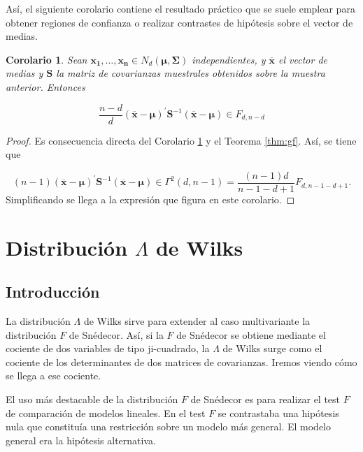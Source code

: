 \documentclass[
  a4paper,
  oneside]{scrbook}
\newtheorem{corollary}{Corolario}[chapter]
\theoremstyle{definition}
\theoremstyle{definition}
\theoremstyle{definition}
\theoremstyle{definition}
\theoremstyle{remark}
\begin{document}
Así, el siguiente corolario contiene el resultado práctico que se suele
emplear para obtener regiones de confianza o realizar contrastes de
hipótesis sobre el vector de medias.

\begin{corollary}
\protect\hypertarget{cor:nose}{}\label{cor:nose}Sean \(\bm{x_1},\ldots, \bm{x_n}\in N_d(\bm{\mu},\bm\Sigma)\)
independientes, y \(\overline{\bm{x}}\) el vector de medias y \(\bm{S}\) la
matriz de covarianzas muestrales obtenidos sobre la muestra anterior.
Entonces

\[\frac{n-d}{d} \left(\overline{\bm{x}}-\bm{\mu}\right)^{\prime} \bm{S}^{-1} \left(\overline{\bm{x}}-\bm{\mu}\right)
\in F_{d,n-d}\]
\end{corollary}

\begin{proof}
Es consecuencia directa del Corolario \ref{cor:nose} y el Teorema \ref{thm:gf}. Así, se
tiene que

\[(n-1) \left(\overline{\bm{x}}-\bm{\mu}\right)^{\prime} \bm{S}^{-1} \left(\overline{\bm{x}}-\bm{\mu}\right)\in \Gamma^2(d,n-1)=\frac{(n-1)d}{n-1-d+1}F_{d,n-1-d+1}.\]
Simplificando se llega a la expresión que figura en este corolario.
\end{proof}

\section{\texorpdfstring{Distribución \(\Lambda\) de Wilks}{Distribución \textbackslash Lambda de Wilks}}\label{distribucion-lambda-de-wilks}

\subsection{Introducción}\label{introduccion}

La distribución \(\Lambda\) de Wilks sirve para extender al caso
multivariante la distribución \(F\) de Snédecor. Así, si la \(F\) de
Snédecor se obtiene mediante el cociente de dos variables de tipo
ji-cuadrado, la \(\Lambda\) de Wilks surge como el cociente de los
determinantes de dos matrices de covarianzas. Iremos viendo cómo se
llega a ese cociente.

El uso más destacable de la distribución \(F\) de Snédecor es para
realizar el test \(F\) de comparación de modelos lineales. En el test \(F\)
se contrastaba una hipótesis nula que constituía una restricción sobre
un modelo más general. El modelo general era la hipótesis alternativa.
\end{document}
